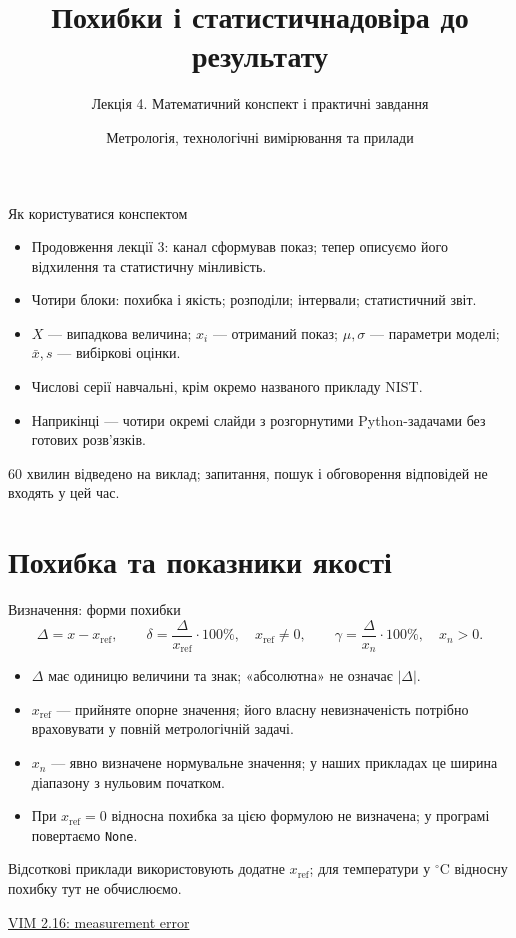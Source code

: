 \documentclass[aspectratio=169,11pt]{beamer}
\title{Похибки і статистична\newline довіра до результату}
\subtitle{Лекція 4. Математичний конспект і практичні завдання}
\author{Метрологія, технологічні вимірювання та прилади}
\date{}
\newcommand{\src}[2]{\par\vfill{\tiny\href{#1}{#2}}}
\newcommand{\xref}{x_{\mathrm{ref}}}
\begin{document}
\begin{frame}\titlepage\end{frame}

\begin{frame}{Як користуватися конспектом}
\begin{itemize}
\item Продовження лекції 3: канал сформував показ; тепер описуємо його відхилення та статистичну мінливість.
\item Чотири блоки: похибка і якість; розподіли; інтервали; статистичний звіт.
\item $X$ — випадкова величина; $x_i$ — отриманий показ; $\mu,\sigma$ — параметри моделі; $\bar x,s$ — вибіркові оцінки.
\item Числові серії навчальні, крім окремо названого прикладу NIST.
\item Наприкінці — чотири окремі слайди з розгорнутими Python-задачами без готових розв'язків.
\end{itemize}
60 хвилин відведено на виклад; запитання, пошук і обговорення відповідей не входять у цей час.
\end{frame}

\section{Похибка та показники якості}
\begin{frame}{Визначення: форми похибки}
\[
\Delta=x-\xref,\qquad
\delta=\frac{\Delta}{\xref}\cdot100\%,\quad \xref\ne0,
\qquad \gamma=\frac{\Delta}{x_n}\cdot100\%,\quad x_n>0.
\]
\begin{itemize}
\item $\Delta$ має одиницю величини та знак; «абсолютна» не означає $|\Delta|$.
\item $\xref$ — прийняте опорне значення; його власну невизначеність потрібно враховувати у повній метрологічній задачі.
\item $x_n$ — явно визначене нормувальне значення; у наших прикладах це ширина діапазону з нульовим початком.
\item При $\xref=0$ відносна похибка за цією формулою не визначена; у програмі повертаємо \texttt{None}.
\end{itemize}
Відсоткові приклади використовують додатне $\xref$; для температури у $^\circ$C відносну похибку тут не обчислюємо.
\src{https://jcgm.bipm.org/vim/en/2.16.html}{VIM 2.16: measurement error}
\end{frame}
\end{document}
